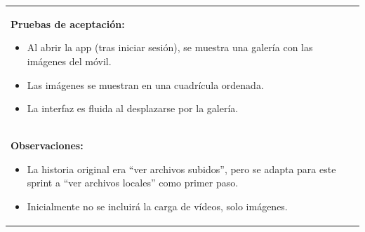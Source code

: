 \begin{table}[H]
\begin{center}
\begin{tabularx}{\textwidth}{|l|X|l|}
{\begin{minipage}{\textwidth}
                \end{minipage}
            } \\
            \hline
            \multicolumn{3}{|p{\textwidth}|}{
                \textbf{Pruebas de aceptación:}
                \begin{itemize}
                    \item Al abrir la app (tras iniciar sesión), se muestra una galería con las imágenes del móvil.
                    \item Las imágenes se muestran en una cuadrícula ordenada.
                    \item La interfaz es fluida al desplazarse por la galería.
                \end{itemize}
            }\\
            \hline
            \multicolumn{3}{|p{\textwidth}|}{
                \textbf{Observaciones:}
                \begin{itemize}
                    \item La historia original era ``ver archivos subidos'', pero se adapta para este sprint a ``ver archivos locales'' como primer paso.
                    \item Inicialmente no se incluirá la carga de vídeos, solo imágenes.
                \end{itemize}
            }\\
            \hline
        \end{tabularx}
    \end{center}
\end{table}


